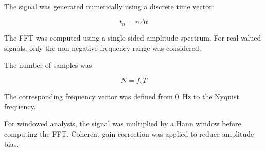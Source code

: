 \documentclass[11pt,a4paper]{article}
\begin{document}
The signal was generated numerically using a discrete time vector:

\begin{equation}
t_n = n\Delta t
\end{equation}

The FFT was computed using a single-sided amplitude spectrum. For real-valued signals, only the non-negative frequency range was considered.

The number of samples was

\begin{equation}
N = f_s T
\end{equation}

The corresponding frequency vector was defined from \SI{0}{Hz} to the Nyquist frequency.

For windowed analysis, the signal was multiplied by a Hann window before computing the FFT. Coherent gain correction was applied to reduce amplitude bias.
\end{document}
